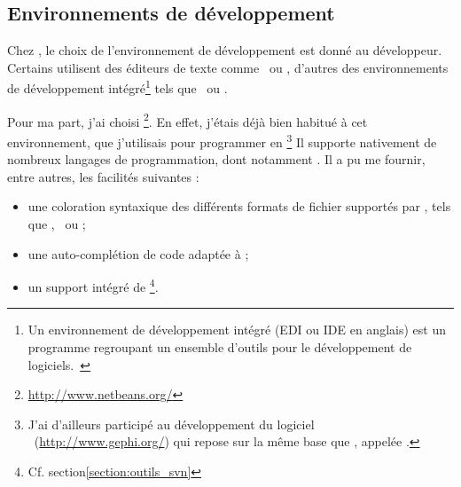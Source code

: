 \subsection{Environnements de développement}

Chez \asl, le choix de l'environnement de développement est donné au développeur. Certains utilisent des éditeurs de texte comme \aultraedit\ ou \avim, d'autres des environnements de développement intégré\footnote{Un environnement de développement intégré (EDI ou IDE en anglais) est un programme regroupant un ensemble d'outils pour le développement de logiciels.~\cite{edi}} tels que \aeclipse\ ou \anetbeans.

Pour ma part, j'ai choisi \anetbeans\footnote{\url{http://www.netbeans.org/}}. En effet, j'étais déjà bien habitué à cet environnement, que j'utilisais pour programmer en \ajava\footnote{J'ai d'ailleurs participé au développement du logiciel \agephi\ (\url{http://www.gephi.org/}) qui repose sur la même base que \anetbeans, appelée \anbp.} Il supporte nativement de nombreux langages de programmation, dont notamment \aphp. Il a pu me fournir, entre autres, les facilités suivantes :

\begin{itemize}
	\item une coloration syntaxique des différents formats de fichier supportés par \asf, tels que \aphp, \ahtml\ ou \ayml ;
	\item une auto-complétion de code adaptée à \asf ;
	\item un support intégré de \asvn\footnote{Cf. section\ref{section:outils_svn}}.
\end{itemize}
